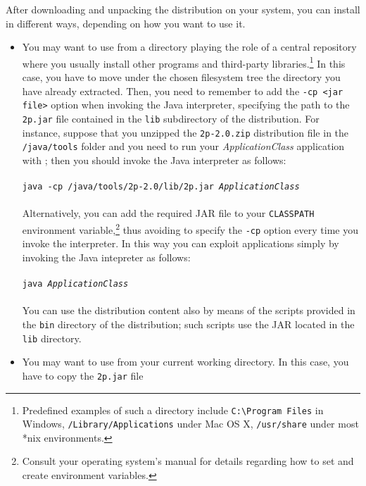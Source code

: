 
After downloading and unpacking the distribution on your system, you
can install \tuprolog{} in different ways, depending on how you want
to use it.

\begin{itemize}
\item You may want to use \tuprolog{} from a directory playing the
  role of a central repository where you usually install other
  programs and third-party libraries.\footnote{Predefined examples of
  such a directory include \texttt{C:\textbackslash Program Files} in
  Windows, \texttt{/Library/Applications} under Mac OS X,
  \texttt{/usr/share} under most *nix environments.}
%
In this case, you have to move under the chosen filesystem tree the
\tuprolog{} directory you have already extracted. Then, you need to
remember to add the \verb|-cp <jar file>| option when invoking the
Java interpreter, specifying the path to the \verb|2p.jar| file
contained in the \verb|lib| subdirectory of the distribution.
%
For instance, suppose that you unzipped the \texttt{2p-2.0.zip}
distribution file in the \texttt{/java/tools} folder and you need
to run your \emph{ApplicationClass} application with \tuprolog{};
then you should invoke the Java interpreter as follows:\\\\
%
\texttt{java -cp /java/tools/2p-2.0/lib/2p.jar
  \textit{ApplicationClass}}\\\\
%
Alternatively, you can add the required \tuprolog{} JAR file to your
\verb|CLASSPATH| environment variable,\footnote{Consult your operating
  system's manual for details regarding how to set and create
  environment variables.} thus avoiding to specify the \verb|-cp|
option every time you invoke the interpreter. In this way you can
exploit \tuprolog{} applications simply by invoking the Java
intepreter as follows:\\\\
%
\texttt{java \textit{ApplicationClass}}\\\\
%
You can use the distribution content also by means of the scripts
provided in the \texttt{bin} directory of the distribution; such
scripts use the JAR located in the \texttt{lib} directory.
%
\item You may want to use \tuprolog{} from your current working
  directory. In this case, you have to copy the \verb|2p.jar| file

\end{itemize}
